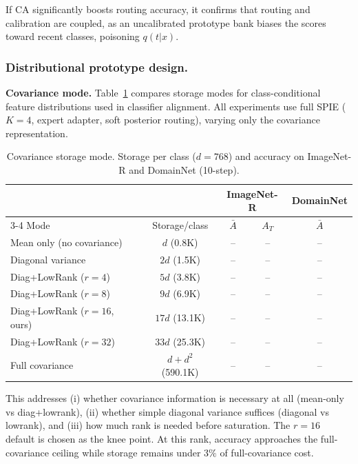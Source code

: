 If CA significantly boosts routing accuracy, it confirms that routing and calibration are coupled, as an uncalibrated prototype bank biases the scores toward recent classes, poisoning $q(t|x)$.

\subsubsection{Distributional prototype design.}

\textbf{Covariance mode.}
Table~\ref{tab:cov_mode} compares storage modes for class-conditional feature distributions used in classifier alignment. All experiments use full SPIE ($K=4$, expert adapter, soft posterior routing), varying only the covariance representation.

\begin{table}[t]
\centering
\caption{Covariance storage mode. Storage per class ($d=768$) and accuracy on ImageNet-R and DomainNet (10-step).}
\label{tab:cov_mode}
\small
\begin{tabular}{lcccc}
\toprule
& & \multicolumn{2}{c}{ImageNet-R} & DomainNet \\
\cmidrule(lr){3-4}
Mode & Storage/class & $\bar{A}$ & $A_T$ & $\bar{A}$ \\
\midrule
Mean only (no covariance)   & $d$ (0.8K)      & -- & -- & -- \\
Diagonal variance           & $2d$ (1.5K)     & -- & -- & -- \\
Diag+LowRank ($r=4$)        & $5d$ (3.8K)     & -- & -- & -- \\
Diag+LowRank ($r=8$)        & $9d$ (6.9K)     & -- & -- & -- \\
Diag+LowRank ($r=16$, ours) & $17d$ (13.1K)   & -- & -- & -- \\
Diag+LowRank ($r=32$)       & $33d$ (25.3K)   & -- & -- & -- \\
Full covariance             & $d+d^2$ (590.1K)& -- & -- & -- \\
\bottomrule
\end{tabular}
\end{table}

This addresses (i) whether covariance information is necessary at all (mean-only vs diag+lowrank), (ii) whether simple diagonal variance suffices (diagonal vs lowrank), and (iii) how much rank is needed before saturation. The $r=16$ default is chosen as the knee point. At this rank, accuracy approaches the full-covariance ceiling while storage remains under $3\%$ of full-covariance cost.

